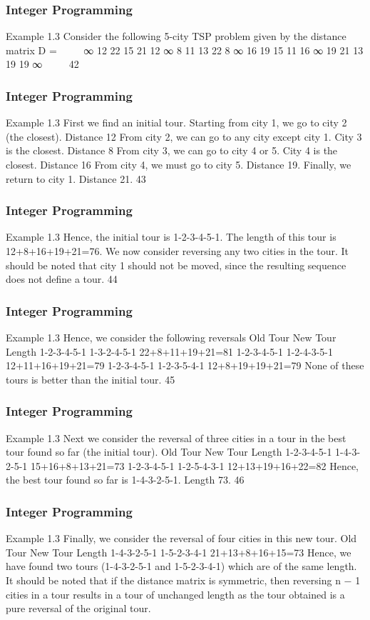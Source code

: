 \begin{frame} 
\frametitle{Integer Programming}     

Example 1.3
Consider the following 5-city TSP problem given by the distance
matrix
D =


∞ 12 22 15 21
12 ∞ 8 11 13
22 8 ∞ 16 19
15 11 16 ∞ 19
21 13 19 19 ∞


42 \end{frame}  \begin{frame} \frametitle{Integer Programming}     
Example 1.3
First we find an initial tour. Starting from city 1, we go to city 2
(the closest). Distance 12
From city 2, we can go to any city except city 1. City 3 is the
closest. Distance 8
From city 3, we can go to city 4 or 5. City 4 is the closest.
Distance 16
From city 4, we must go to city 5. Distance 19.
Finally, we return to city 1. Distance 21.
43 \end{frame}  \begin{frame} \frametitle{Integer Programming}     
Example 1.3
Hence, the initial tour is 1-2-3-4-5-1.
The length of this tour is 12+8+16+19+21=76.
We now consider reversing any two cities in the tour.
It should be noted that city 1 should not be moved, since the
resulting sequence does not define a tour.
44 \end{frame}  \begin{frame} \frametitle{Integer Programming}     
Example 1.3
Hence, we consider the following reversals
Old Tour New Tour Length
1-2-3-4-5-1 1-3-2-4-5-1 22+8+11+19+21=81
1-2-3-4-5-1 1-2-4-3-5-1 12+11+16+19+21=79
1-2-3-4-5-1 1-2-3-5-4-1 12+8+19+19+21=79
None of these tours is better than the initial tour.
45 \end{frame}  \begin{frame} \frametitle{Integer Programming}     
Example 1.3
Next we consider the reversal of three cities in a tour in the best
tour found so far (the initial tour).
Old Tour New Tour Length
1-2-3-4-5-1 1-4-3-2-5-1 15+16+8+13+21=73
1-2-3-4-5-1 1-2-5-4-3-1 12+13+19+16+22=82
Hence, the best tour found so far is 1-4-3-2-5-1. Length 73.
46 \end{frame}  \begin{frame} \frametitle{Integer Programming}     
Example 1.3
Finally, we consider the reversal of four cities in this new tour.
Old Tour New Tour Length
1-4-3-2-5-1 1-5-2-3-4-1 21+13+8+16+15=73
Hence, we have found two tours (1-4-3-2-5-1 and 1-5-2-3-4-1)
which are of the same length.
It should be noted that if the distance matrix is symmetric, then
reversing n − 1 cities in a tour results in a tour of unchanged
length as the tour obtained is a pure reversal of the original tour.

\end{frame}
